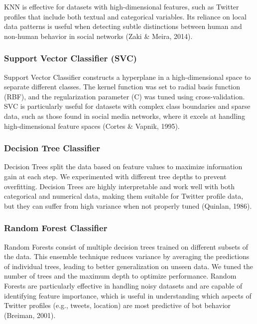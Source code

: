 \documentclass[a4paper,11pt]{article}
\begin{document}
KNN is effective for datasets with high-dimensional features, such as Twitter profiles that include both textual and categorical variables. Its reliance on local data patterns is useful when detecting subtle distinctions between human and non-human behavior in social networks (Zaki \& Meira, 2014).

\subsubsection{Support Vector Classifier (SVC)}

Support Vector Classifier constructs a hyperplane in a high-dimensional space to separate different classes. The kernel function was set to radial basis function (RBF), and the regularization parameter (C) was tuned using cross-validation. SVC is particularly useful for datasets with complex class boundaries and sparse data, such as those found in social media networks, where it excels at handling high-dimensional feature spaces (Cortes \& Vapnik, 1995).

\subsubsection{Decision Tree Classifier}

Decision Trees split the data based on feature values to maximize information gain at each step. We experimented with different tree depths to prevent overfitting. Decision Trees are highly interpretable and work well with both categorical and numerical data, making them suitable for Twitter profile data, but they can suffer from high variance when not properly tuned (Quinlan, 1986).

\subsubsection{Random Forest Classifier}

Random Forests consist of multiple decision trees trained on different subsets of the data. This ensemble technique reduces variance by averaging the predictions of individual trees, leading to better generalization on unseen data. We tuned the number of trees and the maximum depth to optimize performance. Random Forests are particularly effective in handling noisy datasets and are capable of identifying feature importance, which is useful in understanding which aspects of Twitter profiles (e.g., tweets, location) are most predictive of bot behavior (Breiman, 2001).
\end{document}
